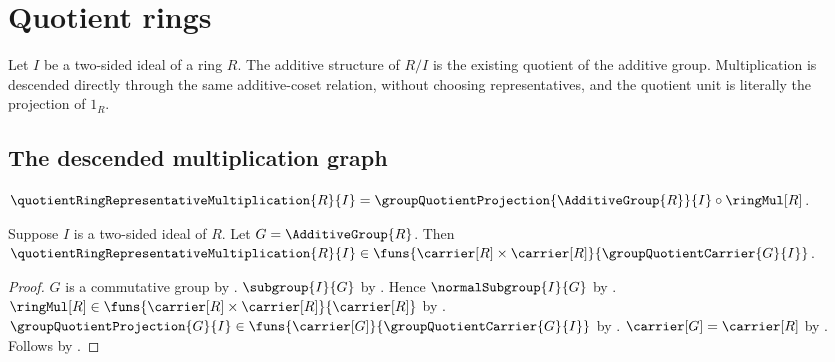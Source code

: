 




\section{Quotient rings}

Let $I$ be a two-sided ideal of a ring $R$.  The additive structure of
$R/I$ is the existing quotient of the additive group.  Multiplication is
descended directly through the same additive-coset relation, without choosing
representatives, and the quotient unit is literally the projection of
$1_R$.

\subsection{The descended multiplication graph}

\begin{definition}\label{quotient_ring_representative_multiplication}
    $\quotientRingRepresentativeMultiplication{R}{I}=
        \groupQuotientProjection{\AdditiveGroup{R}}{I}
            \circ\ringMul[R]$.
\end{definition}

\begin{proposition}\label{quotient_ring_representative_multiplication_type}
    Suppose $I$ is a two-sided ideal of $R$.
    Let $G=\AdditiveGroup{R}$.
    Then $\quotientRingRepresentativeMultiplication{R}{I}\in
        \funs{\carrier[R]\times\carrier[R]}{
            \groupQuotientCarrier{G}{I}}$.
\end{proposition}
\begin{proof}
    $G$ is a commutative group by
        .
    $\subgroup{I}{G}$ by
        .
    Hence $\normalSubgroup{I}{G}$ by
        .
    $\ringMul[R]\in
        \funs{\carrier[R]\times\carrier[R]}{\carrier[R]}$ by
        .
    $\groupQuotientProjection{G}{I}\in
        \funs{\carrier[G]}{\groupQuotientCarrier{G}{I}}$ by
        .
    $\carrier[G]=\carrier[R]$ by .
    Follows by
        .
\end{proof}

